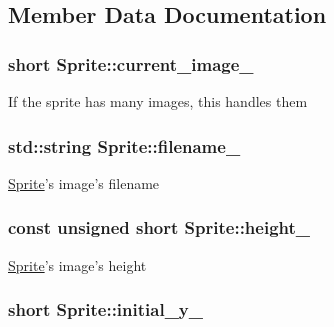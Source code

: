 \subsection{Member Data Documentation}
\hypertarget{classSprite_a8654a8729656ba13695c20c2030de5d0}{
\subsubsection[{current\-\_\-image\-\_\-}]{\setlength{\rightskip}{0pt plus 5cm}short Sprite\-::current\-\_\-image\-\_\-\hspace{0.3cm}{\ttfamily [protected]}}}\label{classSprite_a8654a8729656ba13695c20c2030de5d0}
If the sprite has many images, this handles them \hypertarget{classSprite_acb2c82f6bea52556153897e9270f219d}{
\subsubsection[{filename\-\_\-}]{\setlength{\rightskip}{0pt plus 5cm}std\-::string Sprite\-::filename\-\_\-\hspace{0.3cm}{\ttfamily [protected]}}}\label{classSprite_acb2c82f6bea52556153897e9270f219d}
\hyperlink{classSprite}{Sprite}'s image's filename \hypertarget{classSprite_ae2ddd489c30852d32b7a88d20af9df1e}{
\subsubsection[{height\-\_\-}]{\setlength{\rightskip}{0pt plus 5cm}const unsigned short Sprite\-::height\-\_\-\hspace{0.3cm}{\ttfamily [protected]}}}\label{classSprite_ae2ddd489c30852d32b7a88d20af9df1e}
\hyperlink{classSprite}{Sprite}'s image's height \hypertarget{classSprite_a2b5cccca24f3c3e0f466624cf034e8a9}{
\subsubsection[{initial\-\_\-y\-\_\-}]{\setlength{\rightskip}{0pt plus 5cm}short Sprite\-::initial\-\_\-y\-\_\-\hspace{0.3cm}{\ttfamily [protected]}}}\label{classSprite_a2b5cccca24f3c3e0f466624cf034e8a9}
